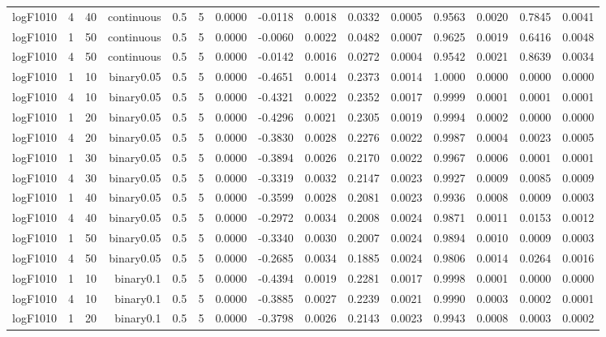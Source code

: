 \begin{longtable}{rrrrrrrrrrrrrrr}
  logF1010 & 4 & 40 & continuous & 0.5 & 5 & 0.0000 & -0.0118 & 0.0018 & 0.0332 & 0.0005 & 0.9563 & 0.0020 & 0.7845 & 0.0041 \\ 
  logF1010 & 1 & 50 & continuous & 0.5 & 5 & 0.0000 & -0.0060 & 0.0022 & 0.0482 & 0.0007 & 0.9625 & 0.0019 & 0.6416 & 0.0048 \\ 
  logF1010 & 4 & 50 & continuous & 0.5 & 5 & 0.0000 & -0.0142 & 0.0016 & 0.0272 & 0.0004 & 0.9542 & 0.0021 & 0.8639 & 0.0034 \\ 
  logF1010 & 1 & 10 & binary0.05 & 0.5 & 5 & 0.0000 & -0.4651 & 0.0014 & 0.2373 & 0.0014 & 1.0000 & 0.0000 & 0.0000 & 0.0000 \\ 
  logF1010 & 4 & 10 & binary0.05 & 0.5 & 5 & 0.0000 & -0.4321 & 0.0022 & 0.2352 & 0.0017 & 0.9999 & 0.0001 & 0.0001 & 0.0001 \\ 
  logF1010 & 1 & 20 & binary0.05 & 0.5 & 5 & 0.0000 & -0.4296 & 0.0021 & 0.2305 & 0.0019 & 0.9994 & 0.0002 & 0.0000 & 0.0000 \\ 
  logF1010 & 4 & 20 & binary0.05 & 0.5 & 5 & 0.0000 & -0.3830 & 0.0028 & 0.2276 & 0.0022 & 0.9987 & 0.0004 & 0.0023 & 0.0005 \\ 
  logF1010 & 1 & 30 & binary0.05 & 0.5 & 5 & 0.0000 & -0.3894 & 0.0026 & 0.2170 & 0.0022 & 0.9967 & 0.0006 & 0.0001 & 0.0001 \\ 
  logF1010 & 4 & 30 & binary0.05 & 0.5 & 5 & 0.0000 & -0.3319 & 0.0032 & 0.2147 & 0.0023 & 0.9927 & 0.0009 & 0.0085 & 0.0009 \\ 
  logF1010 & 1 & 40 & binary0.05 & 0.5 & 5 & 0.0000 & -0.3599 & 0.0028 & 0.2081 & 0.0023 & 0.9936 & 0.0008 & 0.0009 & 0.0003 \\ 
  logF1010 & 4 & 40 & binary0.05 & 0.5 & 5 & 0.0000 & -0.2972 & 0.0034 & 0.2008 & 0.0024 & 0.9871 & 0.0011 & 0.0153 & 0.0012 \\ 
  logF1010 & 1 & 50 & binary0.05 & 0.5 & 5 & 0.0000 & -0.3340 & 0.0030 & 0.2007 & 0.0024 & 0.9894 & 0.0010 & 0.0009 & 0.0003 \\ 
  logF1010 & 4 & 50 & binary0.05 & 0.5 & 5 & 0.0000 & -0.2685 & 0.0034 & 0.1885 & 0.0024 & 0.9806 & 0.0014 & 0.0264 & 0.0016 \\ 
  logF1010 & 1 & 10 & binary0.1 & 0.5 & 5 & 0.0000 & -0.4394 & 0.0019 & 0.2281 & 0.0017 & 0.9998 & 0.0001 & 0.0000 & 0.0000 \\ 
  logF1010 & 4 & 10 & binary0.1 & 0.5 & 5 & 0.0000 & -0.3885 & 0.0027 & 0.2239 & 0.0021 & 0.9990 & 0.0003 & 0.0002 & 0.0001 \\ 
  logF1010 & 1 & 20 & binary0.1 & 0.5 & 5 & 0.0000 & -0.3798 & 0.0026 & 0.2143 & 0.0023 & 0.9943 & 0.0008 & 0.0003 & 0.0002 \\ 

\end{longtable}
